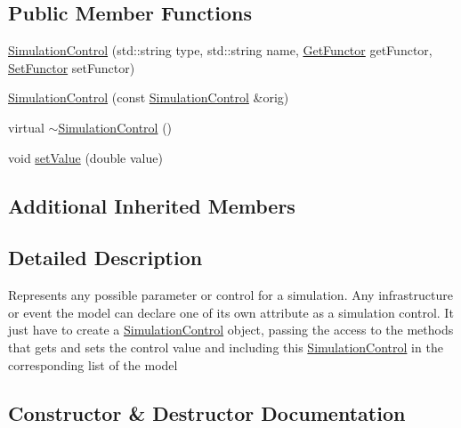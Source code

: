 \subsection*{Public Member Functions}
\begin{DoxyCompactItemize}
\item 
\hyperlink{class_simulation_control_abc4b94dcd52bf60db702206e324481a5}{Simulation\+Control} (std\+::string type, std\+::string name, \hyperlink{_functor_8h_a69893c7d35bc5c3bdb40b1034fe4838e}{Get\+Functor} get\+Functor, \hyperlink{_functor_8h_a60162e2fcd32c651903530f47a55f6c9}{Set\+Functor} set\+Functor)
\item 
\hyperlink{class_simulation_control_a12851e6e9168d46c2a9761ac52b6b49c}{Simulation\+Control} (const \hyperlink{class_simulation_control}{Simulation\+Control} \&orig)
\item 
virtual \hyperlink{class_simulation_control_ae6e46cf7af75d2d6755bcb99ac1a6b23}{$\sim$\+Simulation\+Control} ()
\item 
void \hyperlink{class_simulation_control_a72fafddaf6615fe33a29b49fc08a218a}{set\+Value} (double value)
\end{DoxyCompactItemize}
\subsection*{Additional Inherited Members}


\subsection{Detailed Description}
Represents any possible parameter or control for a simulation. Any infrastructure or event the model can declare one of its own attribute as a simulation control. It just have to create a \hyperlink{class_simulation_control}{Simulation\+Control} object, passing the access to the methods that gets and sets the control value and including this \hyperlink{class_simulation_control}{Simulation\+Control} in the corresponding list of the model 

\subsection{Constructor \& Destructor Documentation}
